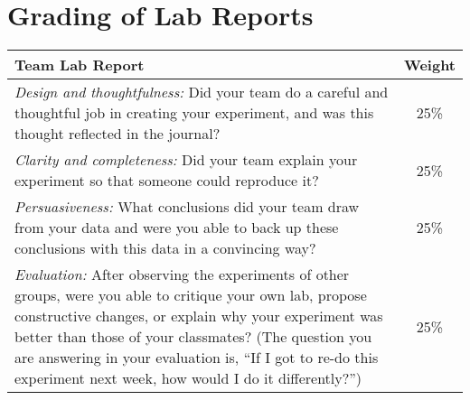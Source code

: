 \section*{Grading of Lab Reports}
%
\begin{tabular}{|p{13cm}|c|}
\hline
\textbf{Team Lab Report} & \textbf{Weight} \\
\hline
\emph{Design and thoughtfulness:} Did your team do a careful and thoughtful job in creating your experiment, and was this thought reflected in the journal? & 25\% \\
\hline
\emph{Clarity and completeness:} Did your team explain your experiment so that someone could reproduce it? & 25\% \\
\hline
\emph{Persuasiveness:} What conclusions did your team draw from your data and were you able to back up these conclusions with this data in a convincing way? & 25\% \\
\hline
\emph{Evaluation:} After observing the experiments of other groups, were you able to critique your own lab, propose constructive changes, or explain why your experiment was better than those of your classmates?  (The question you are answering in your evaluation is, ``If I got to re-do this experiment next week, how would I do it differently?'') & 25\% \\
\hline
\end{tabular}
%

